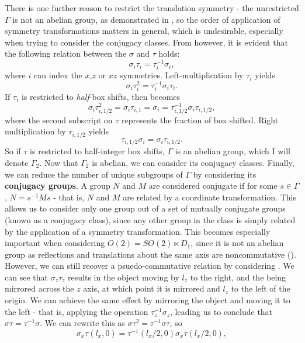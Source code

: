 There is one further reason to restrict the translation symmetry - the unrestricted $\Gamma$ is not an abelian group, as demonstrated in , so the order of application of symmetry transformations matters in general, which is undesirable, especially when trying to consider the conjugacy classes. From  however, it is evident that the following relation between the $\sigma$ and $\tau$ holds:
\begin{equation}
\sigma_{i}\tau_{i} = \tau_i^{-1}\sigma_i,
\end{equation}
where $i$ can index the $x$,$z$ or $xz$ symmetries. Left-multiplication by $\tau_i$ yields
\begin{equation}\label{eq:pscom}
\sigma_i\tau_i^2 = \tau_i^{-1}\sigma_i\tau_i.
\end{equation}
If $\tau_i$ is restricted to \emph{half}-box shifts, then  becomes
\begin{equation}
\sigma_i\tau_{i,1/2}^2 = \sigma_i\tau_{i,1} = \sigma_i = \tau_{i,1/2}^{-1}\sigma_{i}\tau_{i,1/2},
\end{equation}
where the second subscript on $\tau$ represents the fraction of box shifted. Right multiplication by $\tau_{i,1/2}$ yields
\begin{equation}
\tau_{i,1/2}\sigma_{i} = \sigma_{i}\tau_{i,1/2}.
\end{equation}
So if $\tau$ is restricted to half-integer box shifts, $\Gamma$ is an abelian group, which I will denote $\Gamma_{2}$. Now that $\Gamma_2$ is abelian, we can consider its conjugacy classes. 
Finally, we can reduce the number of unique subgroups of $\Gamma$ by considering its {\bf conjugacy groups}. A group $N$ and $M$ are considered conjugate if for some $s \in \Gamma$, $N = s^{-1}Ms$ - that is, $N$ and $M$ are related by a coordinate transformation. This allows us to consider only one group out of a set of mutually conjugate groups (known as a conjugacy class), since any other group in the class is simply related by the application of a symmetry transformation. This becomes especially important when considering $O(2) =  SO(2) \ltimes D_{1}$, since it is not an abelian group as reflections and translations about the same axis are noncommutative (). However, we can still recover a psuedo-commutative relation by considering . We can see that $\sigma_z\tau_z$ results in the object moving by $l_z$ to the right, and the being mirrored across the $z$ axis, at which point it is mirrored and $l_z$ to the left of the origin. We can achieve the same effect by mirroring the object and moving it to the left - that is, applying the operation $\tau_z^{-1}\sigma_z$, leading us to conclude that $\sigma\tau = \tau^{-1}\sigma$. We can rewrite this as $\sigma\tau^2 = \tau^{-1}\sigma\tau$, so
\begin{equation}
\sigma_x\tau(l_x,0) = \tau^{-1}(l_x/2,0)\sigma_x\tau(l_x/2,0),
\end{equation}

